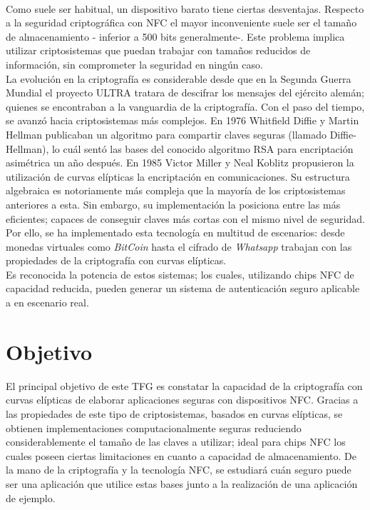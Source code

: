 \documentclass[../PFC.tex]{subfiles}
\begin{document}
\*
\vspace{0.5515cm}
\\
Como suele ser habitual, un dispositivo barato tiene ciertas desventajas. Respecto a la seguridad criptográfica con NFC el mayor inconveniente suele ser el tamaño de almacenamiento - inferior a 500 bits generalmente-. Este problema implica utilizar criptosistemas que puedan trabajar con tamaños reducidos de información, sin comprometer la seguridad en ningún caso.
\*
\vspace{0.5515cm}
\\
La evolución en la criptografía es considerable desde que en la Segunda Guerra Mundial el proyecto ULTRA tratara de descifrar los mensajes del ejército alemán; quienes se encontraban a la vanguardia de la criptografía. Con el paso del tiempo, se avanzó hacia criptosistemas más complejos. En 1976 Whitfield Diffie y Martin Hellman publicaban un algoritmo para compartir claves seguras (llamado Diffie-Hellman)\cite{diffie1976new}, lo cuál sentó las bases del conocido algoritmo RSA \cite{rivest1978method} para encriptación asimétrica un año después. En 1985 Victor Miller y Neal Koblitz propusieron la utilización de curvas elípticas la encriptación en comunicaciones. Su estructura algebraica es notoriamente más compleja que la mayoría de los criptosistemas anteriores a esta. Sin embargo, su implementación la posiciona entre las más eficientes; capaces de conseguir claves más cortas con el mismo nivel de seguridad\cite{lucena}. Por ello, se ha implementado esta tecnología en multitud de escenarios: desde monedas virtuales como \textit{BitCoin} hasta el cifrado de \textit{Whatsapp}\cite{whatsappEncryption} trabajan con las propiedades de la criptografía con curvas elípticas.
\*
\vspace{0.5515cm}
\\
Es reconocida la potencia de estos sistemas; los cuales, utilizando chips NFC de capacidad reducida, pueden generar un sistema de autenticación seguro aplicable a en escenario real.

\section{Objetivo}
\label{Objetivo}

El principal objetivo de este TFG es constatar la capacidad de la criptografía con curvas elípticas de elaborar aplicaciones seguras con dispositivos NFC. Gracias a las propiedades de este tipo de criptosistemas, basados en curvas elípticas, se obtienen implementaciones computacionalmente seguras reduciendo considerablemente el tamaño de las claves a utilizar; ideal para chips NFC los cuales poseen ciertas limitaciones en cuanto a capacidad de almacenamiento. De la mano de la criptografía y la tecnología NFC, se estudiará cuán seguro puede ser una aplicación que utilice estas bases junto a la realización de una aplicación de ejemplo.
\end{document}
